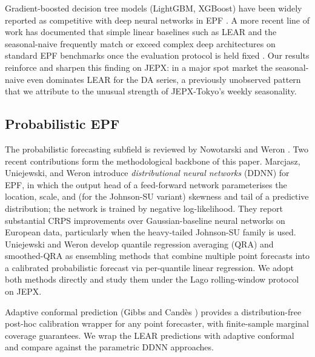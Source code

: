 \documentclass[review,3p,times,authoryear]{elsarticle}
\begin{document}
Gradient-boosted decision tree models (LightGBM, XGBoost) have been widely reported as competitive with deep neural networks in EPF \citep{ke2017,chen2016}. A more recent line of work has documented that simple linear baselines such as LEAR and the seasonal-naive frequently match or exceed complex deep architectures on standard EPF benchmarks once the evaluation protocol is held fixed \citep{lago2021,zeng2023}. Our results reinforce and sharpen this finding on JEPX: in a major spot market the seasonal-naive even dominates LEAR for the DA series, a previously unobserved pattern that we attribute to the unusual strength of JEPX-Tokyo's weekly seasonality.

\subsection{Probabilistic EPF}
The probabilistic forecasting subfield is reviewed by Nowotarski and Weron \citep{nowotarski2018}. Two recent contributions form the methodological backbone of this paper. Marcjasz, Uniejewski, and Weron \citep{marcjasz2023} introduce \emph{distributional neural networks} (DDNN) for EPF, in which the output head of a feed-forward network parameterises the location, scale, and (for the Johnson-SU variant) skewness and tail of a predictive distribution; the network is trained by negative log-likelihood. They report substantial CRPS improvements over Gaussian-baseline neural networks on European data, particularly when the heavy-tailed Johnson-SU family is used. Uniejewski and Weron \citep{uniejewski2021} develop quantile regression averaging (QRA) and smoothed-QRA as ensembling methods that combine multiple point forecasts into a calibrated probabilistic forecast via per-quantile linear regression. We adopt both methods directly and study them under the Lago rolling-window protocol on JEPX.

Adaptive conformal prediction (Gibbs and Cand\`es \citep{gibbs2021}) provides a distribution-free post-hoc calibration wrapper for any point forecaster, with finite-sample marginal coverage guarantees. We wrap the LEAR predictions with adaptive conformal and compare against the parametric DDNN approaches.
\end{document}
